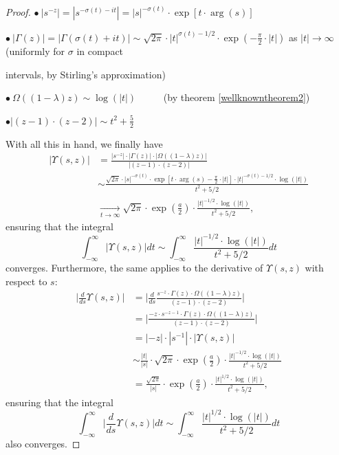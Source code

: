 \documentclass[10pt,a4paper]{amsart}
\newcommand{\difrac}{\displaystyle \frac}
\newcommand{\diint}{\displaystyle \int}
\begin{document}
\begin{proof}
\noindent $\bullet \ |s^{-z}| = |s^{-\sigma(t) - it}| = |s|^{-\sigma(t)} \cdot \exp[t \cdot \arg(s)]$

\noindent $\bullet \ |\Gamma(z)| = |\Gamma(\sigma(t) + it)| \sim \sqrt{2\pi} \cdot |t|^{\sigma(t) - 1/2} \cdot \exp\left(-\difrac{\pi}{2} \cdot |t|\right)$ as $|t| \to \infty$ (uniformly for $\sigma$ in compact 

\noindent intervals, by Stirling's approximation)

\noindent $\bullet \ \Omega((1 - \lambda)z) \sim \log(|t|)$ \ \ \ \ \ (by theorem \ref{wellknowntheorem2})

\noindent $\bullet |(z - 1) \cdot (z - 2)| \sim t^2 + \difrac{5}{2}$

With all this in hand, we finally have \begin{equation*} \begin{split} |\Upsilon(s, z)| & = \difrac{|s^{-z}| \cdot |\Gamma(z)| \cdot |\Omega((1 - \lambda)z)|}{|(z - 1) \cdot (z - 2)|} \\ & \sim \difrac{\sqrt{2\pi} \cdot |s|^{-\sigma(t)} \cdot \exp\left[t \cdot \arg(s) - \difrac{\pi}{2} \cdot |t|\right] \cdot |t|^{-\sigma(t) - 1/2} \cdot \log(|t|)}{t^2 + 5/2} \\ & \xrightarrow[t \to \infty]{} \sqrt{2\pi} \cdot \exp\left(\difrac{a}{2}\right) \cdot \difrac{|t|^{-1/2} \cdot \log(|t|)}{t^2 + 5/2}, \end{split} \end{equation*} ensuring that the integral $$\diint_{-\infty}^{\infty} |\Upsilon(s, z)| dt \sim \diint_{-\infty}^{\infty} \difrac{|t|^{-1/2} \cdot \log(|t|)}{t^2 + 5/2} dt$$ converges. Furthermore, the same applies to the derivative of $\Upsilon(s, z)$ with respect to $s$: \begin{equation*} \begin{split} \Bigg|\difrac{d}{ds} \Upsilon(s, z)\Bigg| & = \Bigg| \difrac{d}{ds} \difrac{s^{-z} \cdot \Gamma(z) \cdot \Omega((1 - \lambda)z)}{(z - 1) \cdot (z - 2)} \Bigg| \\ & = \Bigg| \difrac{-z \cdot s^{- z - 1} \cdot \Gamma(z) \cdot \Omega((1 - \lambda)z)}{(z - 1) \cdot (z - 2)}\Bigg| \\ & = |-z| \cdot |s^{-1}| \cdot |\Upsilon(s, z)| \\ & \sim \difrac{|t|}{|s|} \cdot \sqrt{2\pi} \cdot \exp\left(\difrac{a}{2}\right) \cdot \difrac{|t|^{-1/2} \cdot \log(|t|)}{t^2 + 5/2} \\ & = \difrac{\sqrt{2\pi}}{|s|} \cdot \exp\left(\difrac{a}{2}\right) \cdot \difrac{|t|^{1/2} \cdot \log(|t|)}{t^2 + 5/2}, \end{split} \end{equation*} ensuring that the integral $$\diint_{-\infty}^{\infty} \Bigg|\difrac{d}{ds} \Upsilon(s, z)\Bigg| dt \sim \diint_{-\infty}^{\infty} \difrac{|t|^{1/2} \cdot \log(|t|)}{t^2 + 5/2} dt$$ also converges.


\end{proof}
\end{document}
